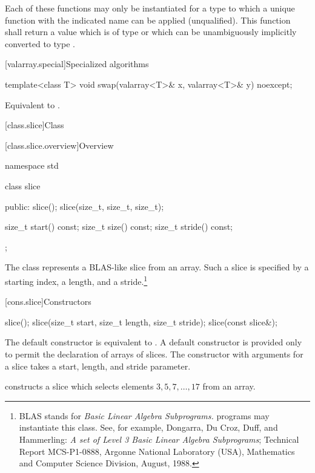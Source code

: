 \begin{itemdescr}
\pnum
\requires
Each of these functions may only be instantiated for a type 
to which a unique function with the indicated name can be applied (unqualified).
This function shall return a value which is of type 
or which can be unambiguously implicitly converted to type .
\end{itemdescr}

[valarray.special]{Specialized algorithms}

%
\begin{itemdecl}
template<class T> void swap(valarray<T>& x, valarray<T>& y) noexcept;
\end{itemdecl}

\begin{itemdescr}
\pnum
\effects Equivalent to .
\end{itemdescr}


[class.slice]{Class }

[class.slice.overview]{Overview}

%
\begin{codeblock}
namespace std {
  class slice {
  public:
    slice();
    slice(size_t, size_t, size_t);

    size_t start() const;
    size_t size() const;
    size_t stride() const;
  };
}
\end{codeblock}

\pnum
The 
class represents a BLAS-like slice from an array.
Such a slice is specified by a starting index, a length, and a
stride.\footnote{BLAS stands for
\textit{Basic Linear Algebra Subprograms.}
\Cpp{} programs may instantiate this class.
See, for example,
Dongarra, Du Croz, Duff, and Hammerling:
\textit{A set of Level 3 Basic Linear Algebra Subprograms};
Technical Report MCS-P1-0888,
Argonne National Laboratory (USA),
Mathematics and Computer Science Division,
August, 1988.}

[cons.slice]{Constructors}

%
\begin{itemdecl}
slice();
slice(size_t start, size_t length, size_t stride);
slice(const slice&);
\end{itemdecl}

\begin{itemdescr}
\pnum
The default constructor is equivalent to .
A default constructor is provided only to permit the declaration of arrays of slices.
The constructor with arguments for a slice takes a start, length, and stride
parameter.

\pnum
\begin{example}
constructs a slice which selects elements $3, 5, 7, \dotsc, 17$ from an array.
\end{example}
\end{itemdescr}

